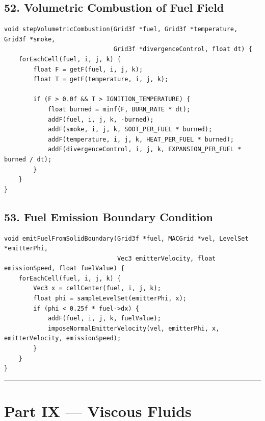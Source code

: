 \documentclass[10pt,letterpaper]{article}
\begin{document}
\subsection*{52. Volumetric Combustion of Fuel Field}

\begin{verbatim}
void stepVolumetricCombustion(Grid3f *fuel, Grid3f *temperature, Grid3f *smoke,
                              Grid3f *divergenceControl, float dt) {
    forEachCell(fuel, i, j, k) {
        float F = getF(fuel, i, j, k);
        float T = getF(temperature, i, j, k);

        if (F > 0.0f && T > IGNITION_TEMPERATURE) {
            float burned = minf(F, BURN_RATE * dt);
            addF(fuel, i, j, k, -burned);
            addF(smoke, i, j, k, SOOT_PER_FUEL * burned);
            addF(temperature, i, j, k, HEAT_PER_FUEL * burned);
            addF(divergenceControl, i, j, k, EXPANSION_PER_FUEL * burned / dt);
        }
    }
}
\end{verbatim}

\subsection*{53. Fuel Emission Boundary Condition}

\begin{verbatim}
void emitFuelFromSolidBoundary(Grid3f *fuel, MACGrid *vel, LevelSet *emitterPhi,
                               Vec3 emitterVelocity, float emissionSpeed, float fuelValue) {
    forEachCell(fuel, i, j, k) {
        Vec3 x = cellCenter(fuel, i, j, k);
        float phi = sampleLevelSet(emitterPhi, x);
        if (phi < 0.25f * fuel->dx) {
            addF(fuel, i, j, k, fuelValue);
            imposeNormalEmitterVelocity(vel, emitterPhi, x, emitterVelocity, emissionSpeed);
        }
    }
}
\end{verbatim}

\medskip\hrule\medskip

\clearpage
{}
\section*{Part IX --- Viscous Fluids}

\end{document}

